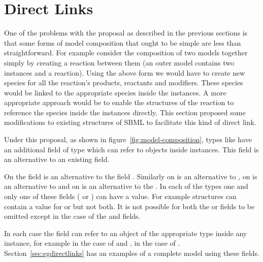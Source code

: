 \documentclass{cekarticle}
\begin{document}

\section{Direct Links}
\label{sec:directlinks}

One of the problems with the proposal as described in the previous sections
is that some forms of model composition that ought to be simple are less than
straightforward.  For example consider the composition of two models together
simply by creating a reaction between them (an outer model contains two instances
and a reaction).  Using the above form we would have to create new species
for all the reaction's products, reactants and modifiers.  These species would be linked
to the appropriate species inside the instances.  A more appropriate approach
would be to enable the  structures of the reaction
to reference the species inside the instances directly.
This section proposed some modifications to existing structures of SBML
to facilitate this kind of direct link.

Under this proposal, as shown in figure~\ref{fig:model-composition}, types like
 have an additional field of type 
 which can refer to objects inside instances.  This field is an
alternative to an existing  field.

On  the  field 
is an alternative to the  field .  Similarly
on   is an
alternative to , on   is
an alternative to  and
on   is an alternative to the .
In each of the types one and only one of
these fields ( or ) can have a value.
For example  structures can contain
a value for  or  but not both.
It is not possible for both the  or  fields to be
omitted except in the case of the  and  fields.

In each case the  field
can refer to an object of the appropriate type inside any instance, for example 
in the case of  and ,  in the case
of . Section~\ref{sec:egdirectlinks} has an examples of a complete model using these fields.
\end{document}
